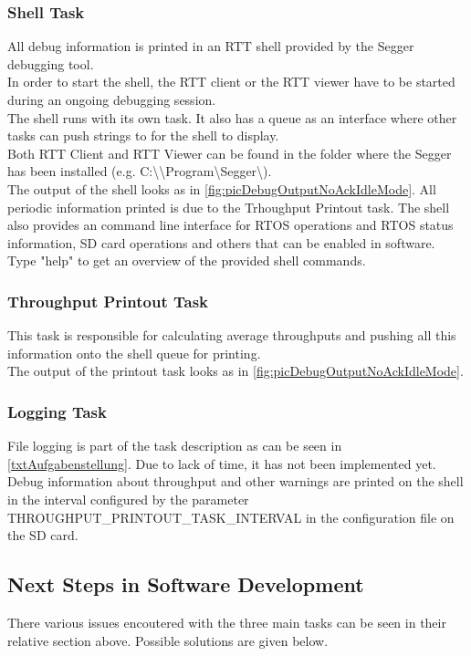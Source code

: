 \subsubsection{Shell Task}
%
All debug information is printed in an RTT shell provided by the Segger debugging tool.\\
In order to start the shell, the RTT client or the RTT viewer have to be started during an ongoing debugging session.\\
The shell runs with its own task. It also has a queue as an interface where other tasks can push strings to for the shell to display.\\
Both RTT Client and RTT Viewer can be found in the folder where the Segger has been installed (e.g. C:\textbackslash \textbackslash Program\textbackslash Segger\textbackslash).\\
The output of the shell looks as in \autoref{fig:picDebugOutputNoAckIdleMode}. All periodic information printed is due to the Trhoughput Printout task. The shell also provides an command line interface for RTOS operations and RTOS status information, SD card operations and others that can be enabled in software. Type "help" to get an overview of the provided shell commands.
%
\subsubsection{Throughput Printout Task}
This task is responsible for calculating average throughputs and pushing all this information onto the shell queue for printing.\\
The output of the printout task looks as in \autoref{fig:picDebugOutputNoAckIdleMode}.
%
\subsubsection{Logging Task}
File logging is part of the task description as can be seen in \autoref{txtAufgabenstellung}. Due to lack of time, it has not been implemented yet.\\
Debug information about throughput and other warnings are printed on the shell in the interval configured by the parameter THROUGHPUT\_PRINTOUT\_TASK\_INTERVAL in the configuration file on the SD card.
%
%
\subsection{Next Steps in Software Development}%
%
There various issues encoutered with the three main tasks can be seen in their relative section above. Possible solutions are given below.
%
